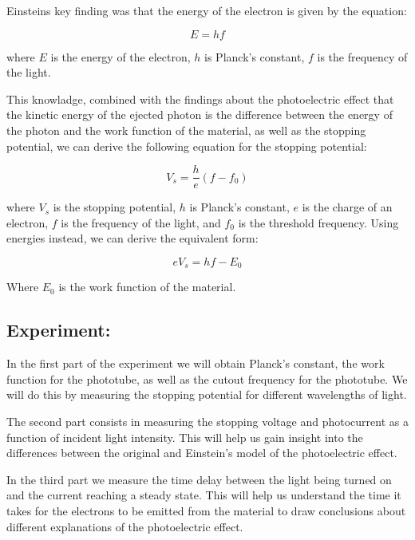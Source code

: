 Einsteins key finding was that the energy of the electron is given by the equation:

\begin{equation}
    \label{eq:energy}
    E = hf
\end{equation}

where $E$ is the energy of the electron, $h$ is Planck's constant, $f$ is the frequency of the light.

This knowladge, combined with the findings about the photoelectric effect that the kinetic energy of the ejected photon is the difference between the energy of the photon and the work function of the material, as well as the stopping potential, we can derive the following equation for the stopping potential:

\begin{equation}
    \label{eq:stopping}
    V_{s} = \frac{h}{e}(f-f_0)
\end{equation}

where $V_s$ is the stopping potential, $h$ is Planck's constant, $e$ is the charge of an electron, $f$ is the frequency of the light, and $f_0$ is the threshold frequency. Using energies instead, we can derive the equivalent form:

\begin{equation}
    \label{eq:stopping_energy}
    eV_{s} = hf - E_0
\end{equation}

Where $E_0$ is the work function of the material.

\subsection{Experiment:}

In the first part of the experiment we will obtain Planck's constant, the work function for the phototube, as well as the cutout frequency for the phototube. We will do this by measuring the stopping potential for different wavelengths of light.

The second part consists in measuring the stopping voltage and photocurrent as a function of incident light intensity. This will help us gain insight into the differences between the original and Einstein's model of the photoelectric effect.

In the third part we measure the time delay between the light being turned on and the current reaching a steady state. This will help us understand the time it takes for the electrons to be emitted from the material to draw conclusions about different explanations of the photoelectric effect.